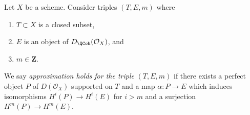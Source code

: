 \begin{definition}
\label{definition-approximation-holds}
Let $X$ be a scheme. Consider triples $(T, E, m)$ where
\begin{enumerate}
\item $T \subset X$ is a closed subset,
\item $E$ is an object of $D_\QCoh(\mathcal{O}_X)$, and
\item $m \in \mathbf{Z}$.
\end{enumerate}
We say {\it approximation holds for the triple} $(T, E, m)$ if
there exists a perfect object $P$ of $D(\mathcal{O}_X)$ supported on $T$
and a map $\alpha : P \to E$ which induces isomorphisms $H^i(P) \to H^i(E)$
for $i > m$ and a surjection $H^m(P) \to H^m(E)$.
\end{definition}